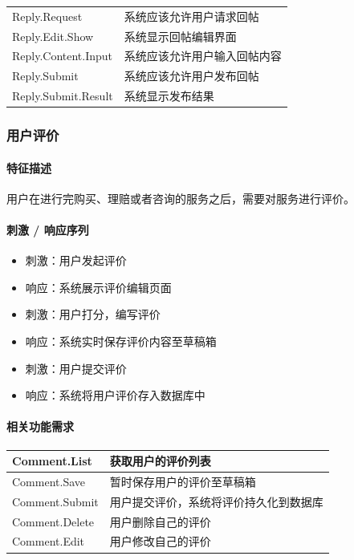 \documentclass[a4paper]{ctexart}
\begin{document}
\begin{center}
    \begin{tabular}{p{6cm}|p{8cm}}
      \toprule
      Reply.Request & 系统应该允许用户请求回帖 \\
      Reply.Edit.Show & 系统显示回帖编辑界面     \\
      \midrule
      Reply.Content.Input & 系统应该允许用户输入回帖内容\\
      \midrule
      Reply.Submit & 系统应该允许用户发布回帖 \\
      Reply.Submit.Result & 系统显示发布结果 \\
      \bottomrule
    \end{tabular}
\end{center}


\subsubsection{用户评价}

\paragraph{特征描述}

用户在进行完购买、理赔或者咨询的服务之后，需要对服务进行评价。

\paragraph{刺激 / 响应序列}

\begin{itemize}
    \item 刺激：用户发起评价
    \item 响应：系统展示评价编辑页面
    \item 刺激：用户打分，编写评价
    \item 响应：系统实时保存评价内容至草稿箱
    \item 刺激：用户提交评价
    \item 响应：系统将用户评价存入数据库中
\end{itemize}

\paragraph{相关功能需求}

\begin{center}
  \begin{tabular}{p{6cm}|p{8cm}}
    \toprule
    Comment.List        & 获取用户的评价列表 \\
    \midrule
    Comment.Save      & 暂时保存用户的评价至草稿箱           \\
    \midrule
    Comment.Submit & 用户提交评价，系统将评价持久化到数据库           \\
    \midrule
    Comment.Delete & 用户删除自己的评价           \\
    \midrule
    Comment.Edit & 用户修改自己的评价          \\
    \bottomrule
  \end{tabular}
\end{center}
\end{document}
